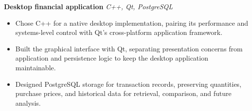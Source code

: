 \textbf{Desktop financial application} \hfill \textit{C++, Qt, PostgreSQL}

\begin{itemize}
    \item Chose C++ for a native desktop implementation, pairing its performance and systems-level control with Qt's cross-platform application framework.

    \item Built the graphical interface with Qt, separating presentation concerns from application and persistence logic to keep the desktop application maintainable.

    \item Designed PostgreSQL storage for transaction records, preserving quantities, purchase prices, and historical data for retrieval, comparison, and future analysis.
\end{itemize}